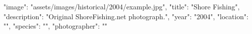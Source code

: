 {
    "image": "assets/images/historical/2004/example.jpg",
    "title": "Shore Fishing",
    "description": "Original ShoreFishing.net photograph.",
    "year": "2004",
    "location": "",
    "species": "",
    "photographer": ""
}

